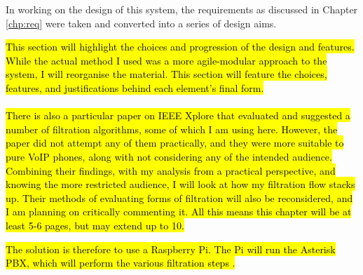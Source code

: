 \documentclass[main.tex]{subfiles}
\begin{document}
In working on the design of this system, the requirements as discussed in Chapter \ref{chp:req} were taken and converted into a series of design aims. 

\hl{This section will highlight the choices and progression of the design and features. While the actual method I used was a more agile-modular approach to the system, I will reorganise the material. This section will feature the choices, features, and justifications behind each element's final form.}
\\\\
\hl{There is also a particular paper on IEEE Xplore that evaluated and suggested a number of filtration algorithms, some of which I am using here. However, the paper did not attempt any of them practically, and they were more suitable to pure VoIP phones, along with not considering any of the intended audience. Combining their findings, with my analysis from a practical perspective, and knowing the more restricted audience, I will look at how my filtration flow stacks up. Their methods of evaluating forms of filtration will also be reconsidered, and I am planning on critically commenting it. All this means this chapter will be at least 5-6 pages, but may extend up to 10.}


\hl{The solution is therefore to use a Raspberry Pi. The Pi will run the Asterisk PBX, which will perform the various filtration steps {\cite{raspbx}}.}
\end{document}
